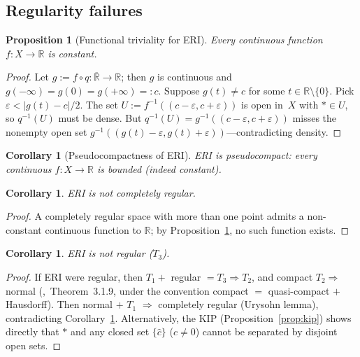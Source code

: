 \documentclass[11pt]{article}
\newtheorem{proposition}[theorem]{Proposition}
\newtheorem{corollary}[theorem]{Corollary}
\theoremstyle{definition}
\theoremstyle{remark}
\begin{document}
\subsection{Regularity failures}

\begin{proposition}[Functional triviality for ERI]\label{prop:ERI-cfunctions}
Every continuous function $f\colon X \to \mathbb{R}$ is constant.
\end{proposition}
\begin{proof}
Let $g := f \circ q\colon \overline{\mathbb{R}} \to \mathbb{R}$;
then $g$ is continuous and
$g(-\infty) = g(0) = g(+\infty) =: c$.
Suppose $g(t) \neq c$ for some $t \in \mathbb{R}\setminus\{0\}$.
Pick $\varepsilon < |g(t) - c|/2$.
The set $U := f^{-1}((c - \varepsilon, c + \varepsilon))$ is open
in~$X$ with $\ast \in U$, so $q^{-1}(U)$ must be dense.
But
$q^{-1}(U) = g^{-1}((c - \varepsilon, c + \varepsilon))$
misses the nonempty open set
$g^{-1}((g(t) - \varepsilon, g(t) + \varepsilon))$---contradicting density.
\end{proof}

\begin{corollary}[Pseudocompactness of ERI]\label{cor:ERI-pseudocompact}
ERI is pseudocompact: every continuous $f\colon X \to \mathbb{R}$
is bounded \textup{(}indeed constant\textup{)}.
\end{corollary}

\begin{corollary}\label{cor:ERI-notCR}
ERI is not completely regular.
\end{corollary}
\begin{proof}
A completely regular space with more than one point admits a non-constant
continuous function to $\mathbb{R}$; by
Proposition~\ref{prop:ERI-cfunctions}, no such function exists.
\end{proof}

\begin{corollary}\label{cor:ERI-notregular}
ERI is not regular \textup{(}$T_3$\textup{)}.
\end{corollary}
\begin{proof}
If ERI were regular, then $T_1 +$ regular $= T_3 \Rightarrow T_2$,
and compact $T_2 \Rightarrow$ normal
(\cite{bib:engelking},~Theorem~3.1.9, under the convention
compact $=$ quasi-compact $+$ Hausdorff).
Then normal $+$ $T_1$ $\Rightarrow$ completely regular (Urysohn lemma),
contradicting Corollary~\ref{cor:ERI-notCR}.
Alternatively, the KIP
(Proposition~\ref{prop:kip}) shows directly that $\ast$ and any
closed set $\{\hat{c}\}$ ($c \neq 0$) cannot be separated by disjoint
open sets.
\end{proof}
\end{document}
